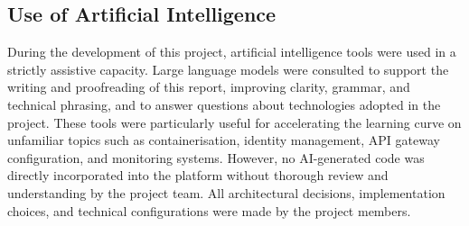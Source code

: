 \documentclass[12pt, a4paper]{report}
\begin{document}
\subsection{Use of Artificial Intelligence}

During the development of this project, artificial intelligence tools were used in a
strictly assistive capacity. Large language models were consulted to support the writing
and proofreading of this report, improving clarity, grammar, and technical phrasing,
and to answer questions about technologies adopted in the project. These tools were
particularly useful for accelerating the learning curve on unfamiliar topics such as
containerisation, identity management, API gateway configuration, and monitoring systems.
However, no AI-generated code was directly incorporated into the platform without thorough
review and understanding by the project team. All architectural decisions, implementation
choices, and technical configurations were made by the project members.

\nocite{ferreira2012a,ferreira2012b,jesus2014}


\end{document}
